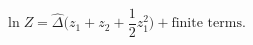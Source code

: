 \begin{equation}\label{Ln_Z_Final}
\ln Z = \hat\Delta \Big(z_1 + z_2 + \frac{1}{2} z_1^2\Big)
+\mbox{finite terms}.
\end{equation}

